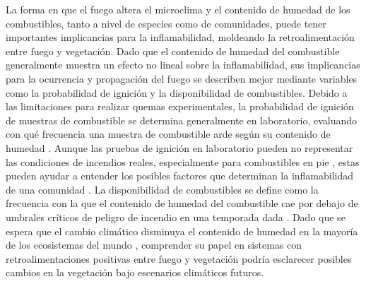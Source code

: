 La forma en que el fuego altera el microclima y el contenido de humedad de los combustibles, tanto a nivel de especies como de comunidades, puede tener importantes implicancias para la inflamabilidad, moldeando la retroalimentación entre fuego y vegetación. Dado que el contenido de humedad del combustible generalmente muestra un efecto no lineal sobre la inflamabilidad, sus implicancias para la ocurrencia y propagación del fuego se describen mejor mediante variables como la probabilidad de ignición y la disponibilidad de combustibles. Debido a las limitaciones para realizar quemas experimentales, la probabilidad de ignición de muestras de combustible se determina generalmente en laboratorio, evaluando con qué frecuencia una muestra de combustible arde según su contenido de humedad \citep{bianchi_ignition_2014}. Aunque las pruebas de ignición en laboratorio pueden no representar las condiciones de incendios reales, especialmente para combustibles en pie \citep{fernandes_plant_2012}, estas pueden ayudar a entender los posibles factores que determinan la inflamabilidad de una comunidad \citep{bianchi_comparison_2018}. La disponibilidad de combustibles se define como la frecuencia con la que el contenido de humedad del combustible cae por debajo de umbrales críticos de peligro de incendio en una temporada dada \citep{burton_shifting_2019}. Dado que se espera que el cambio climático disminuya el contenido de humedad en la mayoría de los ecosistemas del mundo \citep{ellis_global_2022}, comprender su papel en sistemas con retroalimentaciones positivas entre fuego y vegetación podría esclarecer posibles cambios en la vegetación bajo escenarios climáticos futuros.

